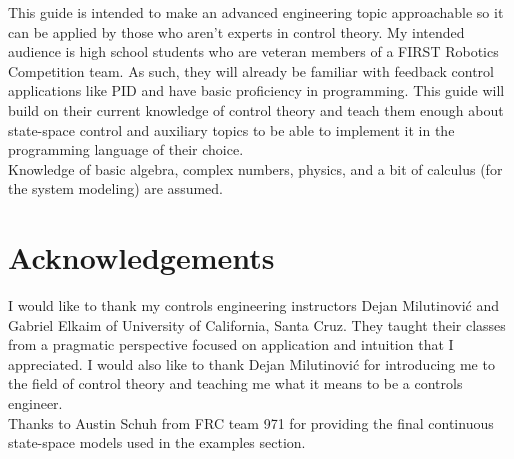 This guide is intended to make an advanced engineering topic approachable so it
can be applied by those who aren't experts in control theory. My intended
audience is high school students who are veteran members of a FIRST Robotics
Competition team. As such, they will already be familiar with feedback control
applications like PID and have basic proficiency in programming. This guide will
build on their current knowledge of control theory and teach them enough about
state-space control and auxiliary topics to be able to implement it in the
programming language of their choice. \\

Knowledge of basic algebra, complex numbers, physics, and a bit of calculus (for
the system modeling) are assumed.

\section*{Acknowledgements}

I would like to thank my controls engineering instructors Dejan Milutinovi\'c
and Gabriel Elkaim of University of California, Santa Cruz. They taught their
classes from a pragmatic perspective focused on application and intuition that I
appreciated. I would also like to thank Dejan Milutinovi\'c for introducing me
to the field of control theory and teaching me what it means to be a controls
engineer. \\

Thanks to Austin Schuh from FRC team 971 for providing the final continuous
state-space models used in the examples section.

\cleardoublepage
